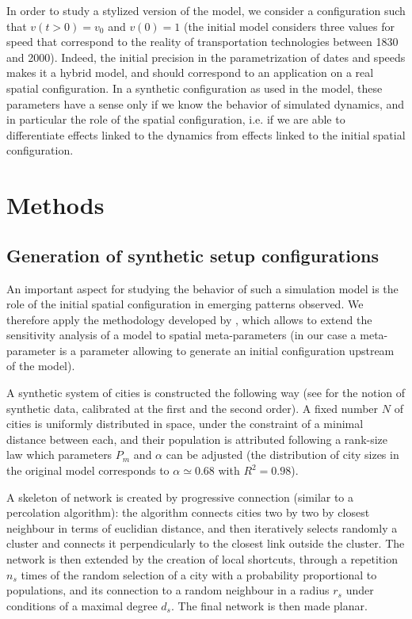In order to study a stylized version of the model, we consider a configuration such that $v(t > 0) = v_0$ and $v(0) = 1$ (the initial model considers three values for speed that correspond to the reality of transportation technologies between 1830 and 2000). Indeed, the initial precision in the parametrization of dates and speeds makes it a hybrid model, and should correspond to an application on a real spatial configuration. In a synthetic configuration as used in the model, these parameters have a sense only if we know the behavior of simulated dynamics, and in particular the role of the spatial configuration, i.e. if we are able to differentiate effects linked to the dynamics from effects linked to the initial spatial configuration.



\section{Methods}

\subsection{Generation of synthetic setup configurations}


An important aspect for studying the behavior of such a simulation model is the role of the initial spatial configuration in emerging patterns observed. We therefore apply the methodology developed by \cite{cottineau2017initial}, which allows to extend the sensitivity analysis of a model to spatial meta-parameters (in our case a meta-parameter is a parameter allowing to generate an initial configuration upstream of the model).


A synthetic system of cities is constructed the following way (see \cite{raimbault2016generation} for the notion of synthetic data, calibrated at the first and the second order). A fixed number $N$ of cities is uniformly distributed in space, under the constraint of a minimal distance between each, and their population is attributed following a rank-size law which parameters $P_{m}$ and $\alpha$ can be adjusted (the distribution of city sizes in the original model corresponds to $\alpha\simeq 0.68$ with $R^2=0.98$).

A skeleton of network is created by progressive connection (similar to a percolation algorithm): the algorithm connects cities two by two by closest neighbour in terms of euclidian distance, and then iteratively selects randomly a cluster and connects it perpendicularly to the closest link outside the cluster. The network is then extended by the creation of local shortcuts, through a repetition $n_s$ times of the random selection of a city with a probability proportional to populations, and its connection to a random neighbour in a radius $r_s$ under conditions of a maximal degree $d_s$. The final network is then made planar.



